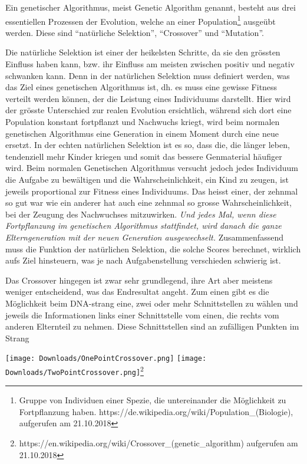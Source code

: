 \documentclass[10pt,a4paper,ngerman,english]{article}
\begin{document}
Ein genetischer Algorithmus, meist Genetic Algorithm genannt, besteht aus drei essentiellen Prozessen der Evolution, welche an einer Population\footnote{Gruppe von Individuen einer Spezie, die untereinander die Möglichkeit zu Fortpflanzung haben. https://de.wikipedia.org/wiki/Population\_(Biologie), aufgerufen am 21.10.2018} ausgeübt werden. Diese sind \enquote{natürliche Selektion}, \enquote{Crossover} und \enquote{Mutation}. 

\bigskip
Die natürliche Selektion ist einer der heikelsten Schritte, da sie den grössten Einfluss haben kann, bzw. ihr Einfluss am meisten zwischen positiv und negativ schwanken kann. Denn in der natürlichen Selektion muss definiert werden, was das Ziel eines genetischen Algorithmus ist, dh. es muss eine gewisse Fitness verteilt werden können, der die Leistung eines Individuums darstellt. Hier wird der grösste Unterschied zur realen Evolution ersichtlich, während sich dort eine Population konstant fortpflanzt und Nachwuchs kriegt, wird beim normalen genetischen Algorithmus eine Generation in einem Moment durch eine neue ersetzt. In der echten natürlichen Selektion ist es so, dass die, die länger leben, tendenziell mehr Kinder kriegen und somit das bessere Genmaterial häufiger wird. Beim normalen Genetischen Algorithmus versucht jedoch jedes Individuum die Aufgabe zu bewältigen und die Wahrscheinlichkeit, ein Kind zu zeugen, ist jeweils proportional zur Fitness eines Individuums. Das heisst einer, der zehnmal so gut war wie ein anderer hat auch eine zehnmal so grosse Wahrscheinlichkeit, bei der Zeugung des Nachwuchses mitzuwirken. \textit{Und jedes Mal, wenn diese Fortpflanzung im genetischen Algorithmus stattfindet, wird danach die ganze Elterngeneration mit der neuen Generation ausgewechselt.} Zusammenfassend muss die Funktion der natürlichen Selektion, die solche Scores berechnet, wirklich aufs Ziel hinsteuern, was je nach Aufgabenstellung verschieden schwierig ist.

Das Crossover hingegen ist zwar sehr grundlegend, ihre Art aber meistens weniger entscheidend, was das Endresultat angeht. Zum einen gibt es die Möglichkeit beim DNA-strang eine, zwei oder mehr Schnittstellen zu wählen und jeweils die Informationen links einer Schnittstelle vom einen, die rechts vom anderen Elternteil zu nehmen. Diese Schnittstellen sind an zufälligen Punkten im Strang

\begin{center}
\texttt{[image: Downloads/OnePointCrossover.png]}
\texttt{[image: Downloads/TwoPointCrossover.png]}\footnote{https://en.wikipedia.org/wiki/Crossover\_(genetic\_algorithm) aufgerufen am 21.10.2018}
\end{center}
\end{document}
